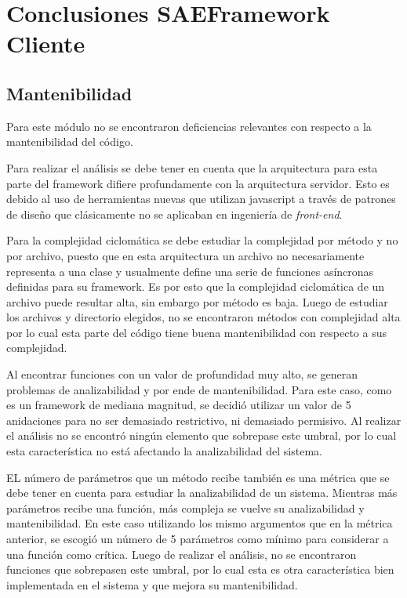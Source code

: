 \section{Conclusiones SAEFramework Cliente}

\subsection{Mantenibilidad}

Para este módulo no se encontraron deficiencias relevantes con respecto a la
mantenibilidad del código.

Para realizar el análisis se debe tener en cuenta que la arquitectura para
esta parte del framework difiere profundamente con la arquitectura servidor.
Esto es debido al uso de herramientas nuevas que utilizan javascript a través
de patrones de diseño que clásicamente no se aplicaban en ingeniería de \textit{front-end}.

Para la complejidad ciclomática se debe estudiar la complejidad por
método y no por archivo, puesto que en esta arquitectura un archivo no
necesariamente representa a una clase y usualmente define una serie de funciones
asíncronas definidas para su framework. Es por esto que la complejidad
ciclomática de un archivo puede resultar alta, sin embargo por método es baja.
Luego de estudiar los archivos y directorio elegidos, no se encontraron métodos
con complejidad alta por lo cual esta parte del código tiene buena mantenibilidad
con respecto a sus complejidad.

Al encontrar funciones con un valor de profundidad muy alto, se generan
problemas de analizabilidad y por ende de mantenibilidad. Para este caso,
como es un framework de mediana magnitud, se decidió utilizar un valor de 5
anidaciones para no ser demasiado restrictivo, ni demasiado permisivo.
Al realizar el análisis no se encontró ningún elemento que sobrepase este
umbral, por lo cual esta característica no está afectando la analizabilidad del
sistema.

EL número de parámetros que un método recibe también es una métrica que se debe
tener en cuenta para estudiar la analizabilidad de un sistema. Mientras más
parámetros recibe una función, más compleja se vuelve su analizabilidad y
mantenibilidad. En este caso utilizando los mismo argumentos que en la métrica
anterior, se escogió un número de 5 parámetros como mínimo para considerar a
una función como crítica. Luego de realizar el análisis, no se encontraron
funciones que sobrepasen este umbral, por lo cual esta es otra característica
bien implementada en el sistema y que mejora su mantenibilidad.

